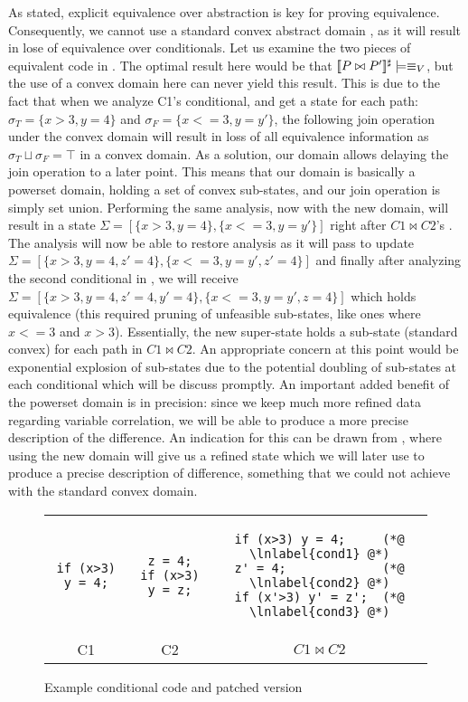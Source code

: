 As stated, explicit equivalence over abstraction is key for proving equivalence. Consequently, we cannot use a standard convex abstract domain \cite{JeannetMine09}, as it will result in lose of equivalence over conditionals. Let us examine the two pieces of equivalent code in . The optimal result here would be that $\lbrack\!\lbrack P \bowtie P' \rbrack\!\rbrack^{\sharp} \models \equiv_V$, but the use of a convex domain here can never yield this result. This is due to the fact that when we analyze C1's conditional, and get a state for each path: $\sigma_T = \{x>3,y=4\}$ and $\sigma_F = \{x<=3,y=y'\}$, the following join operation under the convex domain will result in loss of all equivalence information as $\sigma_T \sqcup \sigma_F = \top$ in a convex domain. As a solution, our domain allows delaying the join operation to a later point. This means that our domain is basically a powerset domain, holding a set of convex sub-states, and our join operation is simply set union. Performing the same analysis, now with the new domain, will result in a state $\Sigma = [\{x>3,y=4\},\{x<=3,y=y'\}]$ right after $C1 \bowtie C2$'s . The analysis will now be able to restore analysis as it will pass  to update $\Sigma = [\{x>3,y=4,z'=4\},\{x<=3,y=y',z'=4\}]$ and finally after analyzing the second conditional in , we will receive $\Sigma = [\{x>3,y=4,z'=4,y'=4\},\{x<=3,y=y',z=4\}]$ which holds equivalence (this required pruning of unfeasible sub-states, like ones where $x<=3$ and $x>3$). Essentially, the new super-state holds a sub-state (standard convex) for each path in $C1 \bowtie C2$. An appropriate concern at this point would be exponential explosion of sub-states due to the potential doubling of sub-states at each conditional which will be discuss promptly. An important added benefit of the powerset domain is in precision: since we keep much more refined data regarding variable correlation, we will be able to produce a more precise description of the difference. An indication for this can be drawn from , where using the new domain will give us a refined state which we will later use to produce a precise description of difference, something that we could not achieve with the standard convex domain.

\begin{figure}
\centering
\begin{tabular}{ccc}
\begin{lstlisting}
if (x>3) y = 4;
\end{lstlisting}
&
\begin{lstlisting}
z = 4;
if (x>3) y = z;
\end{lstlisting}
&
\begin{lstlisting}
if (x>3) y = 4;     (*@ \lnlabel{cond1} @*)
z' = 4;             (*@ \lnlabel{cond2} @*)
if (x'>3) y' = z';  (*@ \lnlabel{cond3} @*)
\end{lstlisting}
\\
\small{C1} & \small{C2} & \small{$C1 \bowtie C2$}
\end{tabular}
\caption{Example conditional code and patched version}
\end{figure}

